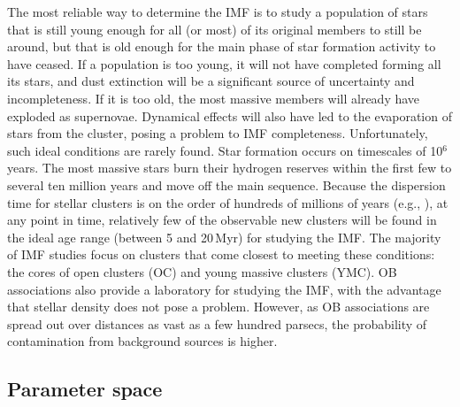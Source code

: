 \documentclass{aa}
\newcommand{\h}[1]{$^{#1}$}
\begin{document}
The most reliable way to determine the IMF is to study a population of stars that is still young enough for all (or most) of its original members to still be around, but that is old enough for the main phase of star formation activity to have ceased.
If a population is too young, it will not have completed forming all its stars, and dust extinction will be a significant source of uncertainty and incompleteness.
  If it is too old, the most massive members will already have exploded as supernovae.
Dynamical effects will also have led to the evaporation of stars from the cluster, posing a problem to IMF completeness.
Unfortunately, such ideal conditions are rarely found.
Star formation occurs on timescales of 10\h6 years.
The most massive stars burn their hydrogen reserves within the first few to several ten million years and move off the main sequence.
Because the dispersion time for stellar clusters is on the order of hundreds of millions of years (e.g., \citealt{Lada2003-ip}), at any point in time, relatively few of the observable new clusters will be found in the ideal age range (between 5 and 20\,Myr) for studying the IMF\@.
The majority of IMF studies focus on clusters that come closest to meeting these conditions: the cores of open clusters (OC) and young massive clusters (YMC).
OB associations also provide a laboratory for studying the IMF, with the advantage that stellar density does not pose a problem.
However, as OB associations are spread out over distances as vast as a few hundred parsecs, the probability of contamination from background sources is higher.


\subsection{Parameter space}
\label{subsec:parameter_space}
\end{document}
